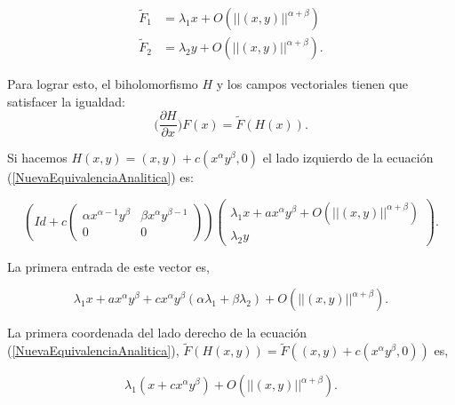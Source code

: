 \begin{equation*}
\label{CampoVectFinal}
\begin{aligned}
\tilde{F}_{1} &= \lambda_{1}x +O(||(x,y)||^{\alpha+\beta})\\
\tilde{F}_{2} &= \lambda_{2}y + O(||(x,y)||^{\alpha+\beta}).
\end{aligned}
\end{equation*}

\noindent Para lograr esto, el biholomorfismo $H$ y los campos vectoriales tienen que satisfacer la igualdad:
\begin{equation}
\label{NuevaEquivalenciaAnalitica}
\Big(\frac{\partial H}{\partial x}\Big)F(x)=\tilde{F}(H(x)).
\end{equation}


\noindent Si hacemos $H(x,y)=(x,y)+c(x^{\alpha}y^{\beta},0)$ el lado izquierdo de la ecuación (\ref{NuevaEquivalenciaAnalitica}) es:

\begin{equation*}
(Id+c\begin{pmatrix} \alpha x^{\alpha -1}y^{\beta} & \beta x^{\alpha}y^{\beta -1} \\ 0 & 0 \end{pmatrix})\begin{pmatrix}\lambda_{1}x +ax^{\alpha}y^{\beta}+O(||(x,y)||^{\alpha+\beta})\\ \lambda_{2}y \end{pmatrix}.
\end{equation*} 

\noindent La primera entrada de este vector es,

\begin{equation}
\label{asa}
\lambda_{1}x +ax^{\alpha}y^{\beta}+cx^{\alpha}y^{\beta}(\alpha\lambda_{1} +\beta\lambda_{2}) +O(||(x,y)||^{\alpha+\beta}).
\end{equation} 

\noindent La primera coordenada del lado derecho de la ecuación (\ref{NuevaEquivalenciaAnalitica}), $\tilde{F}(H(x,y))=\tilde{F}((x,y)+c(x^{\alpha}y^{\beta},0))$ es,

\begin{equation}
\label{usa}
\lambda_{1}(x+cx^{\alpha}y^{\beta}) + O(||(x,y)||^{\alpha+\beta}).
\end{equation}

